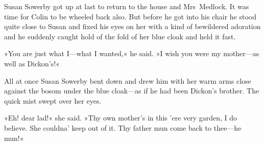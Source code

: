 Susan Sowerby got up at last to return to the house and Mrs~Medlock. It was time for Colin to be wheeled back also. But before he got into his chair he stood quite close to Susan and fixed his eyes on her with a kind of bewildered adoration and he suddenly caught hold of the fold of her blue cloak and held it fast.

»You are just what I—what I wanted,« he said. »I wish you were my mother—as well as Dickon's!«

All at once Susan Sowerby bent down and drew him with her warm arms close against the bosom under the blue cloak—as if he had been Dickon's brother. The quick mist swept over her eyes.

»Eh! dear lad!« she said. »Thy own mother's in this 'ere very garden, I do believe. She couldna' keep out of it. Thy father mun come back to thee—he mun!«